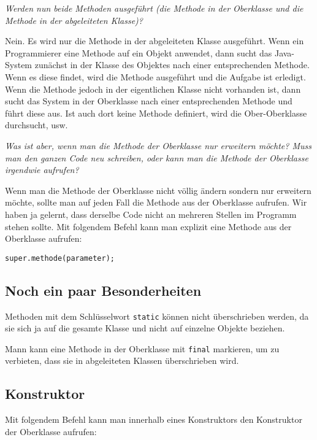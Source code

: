 \emph{Werden nun beide Methoden ausgeführt (die Methode in der Oberklasse und
die Methode in der abgeleiteten Klasse)?}

Nein. Es wird nur die Methode in der abgeleiteten Klasse ausgeführt. Wenn ein
Programmierer eine Methode auf ein Objekt anwendet, dann sucht das Java-System
zunächst in der Klasse des Objektes nach einer entsprechenden Methode. Wenn es
diese findet, wird die Methode ausgeführt und die Aufgabe ist erledigt. Wenn
die Methode jedoch in der eigentlichen Klasse nicht vorhanden ist, dann sucht
das System in der Oberklasse nach einer entsprechenden Methode und führt diese
aus. Ist auch dort keine Methode definiert, wird die Ober-Oberklasse
durchsucht, usw.

\emph{Was ist aber, wenn man die Methode der Oberklasse nur erweitern möchte?
Muss man den ganzen Code neu schreiben, oder kann man die Methode der
Oberklasse irgendwie aufrufen?} 

Wenn man die Methode der Oberklasse nicht völlig ändern sondern nur erweitern
möchte, sollte man auf jeden Fall die Methode aus der Oberklasse aufrufen. Wir
haben ja gelernt, dass derselbe Code nicht an mehreren Stellen im Programm
stehen sollte. Mit folgendem Befehl kann man explizit eine Methode aus der
Oberklasse aufrufen:

\begin{lstlisting}
super.methode(parameter);
\end{lstlisting}


\subsection{Noch ein paar Besonderheiten}

\begin{compactitem}
\item Methoden mit dem Schlüsselwort \verb|static| können nicht überschrieben
werden, da sie sich ja auf die gesamte Klasse und nicht auf einzelne Objekte
beziehen.
\item Mann kann eine Methode in der Oberklasse mit \verb|final| markieren, um zu
verbieten, dass sie in abgeleiteten Klassen überschrieben wird.
\end{compactitem}


\subsection{Konstruktor}

Mit folgendem Befehl kann man innerhalb eines Konstruktors den Konstruktor der
Oberklasse aufrufen:

